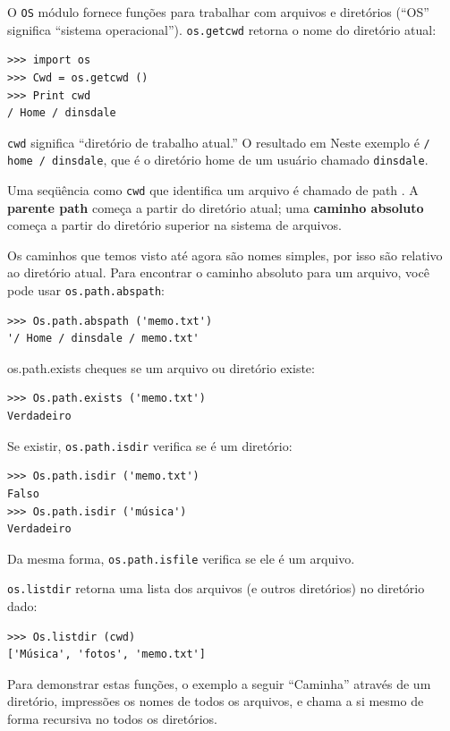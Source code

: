 \documentclass[10pt]{book}
\begin{document}
\begin{exercise}
\begin{v erbatim}
O {\tt OS} módulo fornece funções para trabalhar com arquivos e
diretórios (``OS'' significa ``sistema operacional''). {\tt os.getcwd}
retorna o nome do diretório atual:

\begin{verbatim}
>>> import os
>>> Cwd = os.getcwd ()
>>> Print cwd
/ Home / dinsdale
\end{verbatim}
%
{\tt cwd} significa ``diretório de trabalho atual.'' O resultado em
Neste exemplo é {\tt / home / dinsdale}, que é o diretório home de um
usuário chamado {\tt dinsdale}.

Uma seqüência como {\tt cwd} que identifica um arquivo é chamado de {path \bf}.
A {\bf parente path} começa a partir do diretório atual;
uma {\bf caminho absoluto} começa a partir do diretório superior na
sistema de arquivos.

Os caminhos que temos visto até agora são nomes simples, por isso são
relativo ao diretório atual. Para encontrar o caminho absoluto para
um arquivo, você pode usar {\tt os.path.abspath}:

\begin{verbatim}
>>> Os.path.abspath ('memo.txt')
'/ Home / dinsdale / memo.txt'
\end{verbatim}
%
{os.path.exists \tt} cheques
se um arquivo ou diretório existe:

\begin{verbatim}
>>> Os.path.exists ('memo.txt')
Verdadeiro
\end{verbatim}
%
Se existir, {\tt os.path.isdir} verifica se é um diretório:

\begin{verbatim}
>>> Os.path.isdir ('memo.txt')
Falso
>>> Os.path.isdir ('música')
Verdadeiro
\end{verbatim}
%
Da mesma forma, {\tt os.path.isfile} verifica se ele é um arquivo.

{\tt os.listdir} retorna uma lista dos arquivos (e outros diretórios)
no diretório dado:

\begin{verbatim}
>>> Os.listdir (cwd)
['Música', 'fotos', 'memo.txt']
\end{verbatim}
%
Para demonstrar estas funções, o exemplo a seguir
``Caminha'' através de um diretório, impressões
os nomes de todos os arquivos, e chama a si mesmo de forma recursiva no
todos os diretórios.


\end{v erbatim}
\end{exercise}
\end{document}
